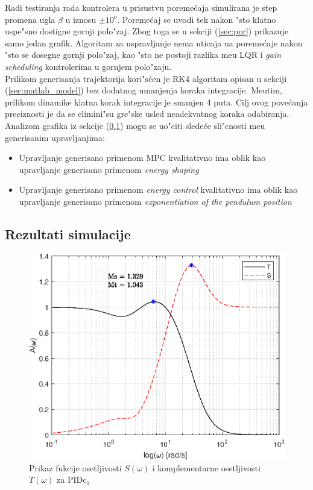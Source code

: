 \documentclass[a4paper,11pt]{article}
\theoremstyle{definition} \newtheorem{deff}{Definicija}[section]
\theoremstyle{definition} \newtheorem{prim}[deff]{Primer}
\theoremstyle{plain} \newtheorem{teor}[deff]{Teorema}
\begin{document}
	Radi testiranja rada kontrolera u prisustvu poreme\'caja simulirana je step promena ugla $\beta$ u iznosu $\pm10^o$. Poreme\'caj se uvodi tek nakon "sto klatno uspe"sno dostigne gornji polo"zaj. Zbog toga se u sekciji (\ref{sec:por}) prikazuje samo jedan grafik. Algoritam za uspravljanje nema uticaja na poreme\'caje nakon "sto se dosegne gornji polo"zaj, kao "sto ne postoji razlika me\dj u LQR i \emph{gain scheduling} kontrolerima u gornjem polo"zaju.\\
	
	Prilikom generisanja trajektorija kori"s\'cen je RK4 algoritam opisan u sekciji (\ref{sec:matlab_model}) bez dodatnog umanjenja koraka integracije. Me\dj utim, prilikom dinamike klatna korak integracije je smanjen 4 puta. Cilj ovog pove\'canja preciznosti je da se elimini"su gre"ske usled neadekvatnog koraka odabiranja. \\
	
	Analizom grafika iz sekcije (\ref{sec:grafici}) mogu se uo"citi slede\'ce sli"cnosti me\dj u generisanim upravljanjima:
	\begin{itemize}
		\item Upravljanje generisano primenom MPC kvalitativno ima oblik kao upravljanje generisano primenom \emph{energy shaping}
		\item Upravljanje generisano primenom \emph{energy control} kvalitativno ima oblik kao upravljanje generisano primenom \emph{exponentiation of the pendulum position}
	\end{itemize} 
	
	
	
	
	
	
	
	
	
	
	
	
	
	
	
	\clearpage
	\subsection{Rezultati simulacije} \label{sec:grafici}
	\begin{figure}[!h]
		\centering
		\includegraphics[width=0.47\linewidth]{slike/Ms_Mt_pidc.eps}
		\caption{Prikaz fukcije osetljivosti $S(\omega)$ i komplementarne osetljivosti $T(\omega)$ za PID$\text{c}_1$}
		\label{fig:MsMt_pidc}
	\end{figure}
	
\end{document}

